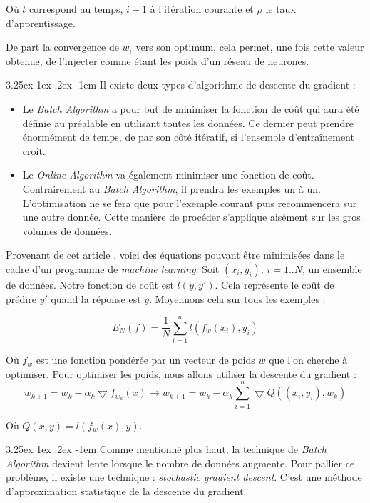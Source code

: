 \documentclass[a4paper, 11pt]{article}
\makeatletter
\renewcommand\paragraph{\@startsection{paragraph}{5}{\z@}%
  {3.25ex \@plus1ex \@minus.2ex}%
  {-1em}%
  {\normalfont\normalsize\bfseries}}
\makeatother
\begin{document}
Où $t$ correspond au temps, $i-1$ à l'itération courante et $\rho$ le taux d'apprentissage.

De part la convergence de $w_i$ vers son optimum, cela permet, une fois cette valeur obtenue, de l'injecter
comme étant les poids d'un réseau de neurones.

\paragraph{}
Il existe deux types d'algorithme de descente du gradient :
\begin{itemize}
\item Le \textit{Batch Algorithm} a pour but de minimiser la fonction de coût qui aura été définie au préalable en utilisant 
toutes les données. Ce dernier peut prendre énormément de temps, de par son côté itératif, si l'ensemble d'entraînement croît.
\item Le \textit{Online Algorithm} va également minimiser une fonction de coût. Contrairement au \textit{Batch Algorithm}, il
prendra les exemples un à un. L'optimisation ne se fera que pour l'exemple courant puis recommencera sur une autre donnée. 
Cette manière de procéder s'applique aisément sur les gros volumes de données.
\end{itemize}

Provenant de cet article \cite{descente_du_gradient_stochastique}, voici des équations pouvant être minimisées dans
le cadre d'un programme de \textit{machine learning}.
Soit $(x_i,y_i)\text{,\ } i=1..N$, un ensemble de données. Notre fonction de coût est $l(y,y')$.
Cela représente le coût de prédire $y'$ quand la réponse est $y$. Moyennons cela sur tous les exemples :

$$E_N(f) = \frac{1}{N} \sum_{i=1}^{n}l(f_w(x_i),y_i)$$

Où $f_w$ est une fonction pondérée par un vecteur de poids $w$ que l'on cherche à optimiser.
Pour optimiser les poids, nous allons utiliser la descente du gradient :
$$w_{k+1} = w_k - \alpha_k \bigtriangledown f_{w_k}(x) \rightarrow w_{k+1} =
w_k -\alpha_k \sum_{i=1}^n \bigtriangledown Q ((x_i,y_i), w_k)$$

Où $Q(x,y) = l(f_w(x),y)$.

\paragraph{}
Comme mentionné plus haut, la technique de \textit{Batch Algorithm} devient lente lorsque le nombre de données augmente.
Pour pallier ce problème, il existe une technique : \textit{stochastic gradient descent}. C'est une méthode d'approximation
statistique de la descente du gradient.
\end{document}
